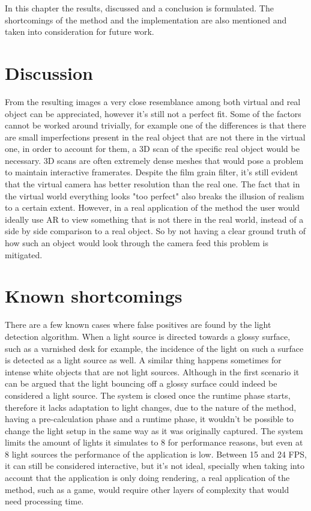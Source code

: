 In this chapter the results, discussed and a conclusion is formulated. The shortcomings of the method and the implementation are also mentioned and taken into consideration for future work.

\section{Discussion}
From the resulting images a very close resemblance among both virtual and real object can be appreciated, however it's still not a perfect fit. Some of the factors cannot be worked around trivially, for example one of the differences is that there are small imperfections present in the real object that are not there in the virtual one, in order to account for them, a 3D scan of the specific real object would be necessary. 3D scans are often extremely dense meshes that would pose a problem to maintain interactive framerates.\newline
Despite the film grain filter, it's still evident that the virtual camera has better resolution than the real one. The fact that in the virtual world everything looks "too perfect" also breaks the illusion of realism to a certain extent. However, in a real application of the method the user would ideally use AR to view something that is not there in the real world, instead of a side by side comparison to a real object. So by not having a clear ground truth of how such an object would look through the camera feed this problem is mitigated.

\section{Known shortcomings}
There are a few known cases where false positives are found by the light detection algorithm. When a light source is directed towards a glossy surface, such as a varnished desk for example, the incidence of the light on such a surface is detected as a light source as well. A similar thing happens sometimes for intense white objects that are not light sources. Although in the first scenario it can be argued that the light bouncing off a glossy surface could indeed be considered a light source. The system is closed once the runtime phase starts, therefore it lacks adaptation to light changes, due to the nature of the method, having a pre-calculation phase and a runtime phase, it wouldn't be possible to change the light setup in the same way as it was originally captured.\newline
The system limits the amount of lights it simulates to 8 for performance reasons, but even at 8 light sources the performance of the application is low. Between 15 and 24 FPS, it can still be considered interactive, but it's not ideal, specially when taking into account that the application is only doing rendering, a real application of the method, such as a game, would require other layers of complexity that would need processing time.

